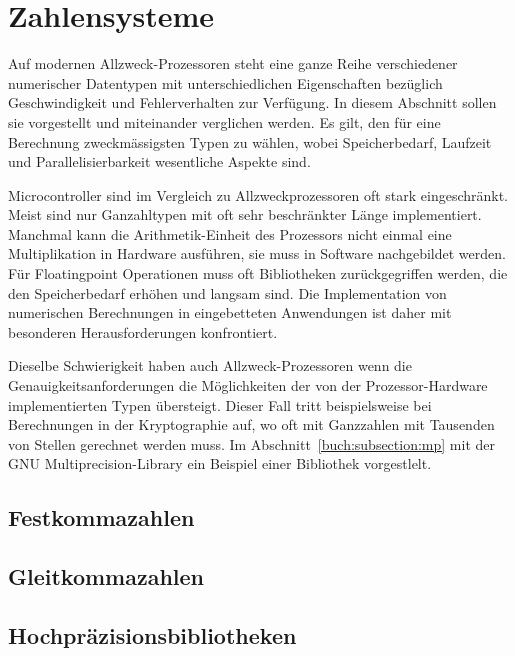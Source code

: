 %
%
%
\section{Zahlensysteme
\label{buch:section:zahlensysteme}}
Auf modernen Allzweck-Prozessoren steht eine ganze Reihe verschiedener
numerischer Datentypen mit unterschiedlichen Eigenschaften
bezüglich Geschwindigkeit und Fehlerverhalten zur Verfügung.
In diesem Abschnitt sollen sie vorgestellt und miteinander verglichen
werden.
Es gilt, den für eine Berechnung zweckmässigsten Typen zu wählen,
wobei Speicherbedarf, Laufzeit und Parallelisierbarkeit wesentliche
Aspekte sind.

Microcontroller sind im Vergleich zu Allzweckprozessoren oft stark
%
eingeschränkt.
Meist sind nur Ganzahltypen mit oft sehr beschränkter Länge implementiert.
Manchmal kann die Arithmetik-Einheit des Prozessors nicht einmal eine
Multiplikation in Hardware ausführen, sie muss in Software nachgebildet
werden.
Für Floatingpoint Operationen muss oft Bibliotheken zurückgegriffen
werden, die den Speicherbedarf erhöhen und langsam sind.
Die Implementation von numerischen Berechnungen in eingebetteten Anwendungen
ist daher mit besonderen Herausforderungen konfrontiert.

Dieselbe Schwierigkeit haben auch Allzweck-Prozessoren wenn die
Genauigkeitsanforderungen die Möglichkeiten der von der Prozessor-Hardware
implementierten Typen übersteigt.
Dieser Fall tritt beispielsweise bei Berechnungen in der Kryptographie auf,
wo oft mit Ganzzahlen mit Tausenden von Stellen gerechnet werden muss.
Im Abschnitt~\ref{buch:subsection:mp} mit der GNU Multiprecision-Library
ein Beispiel einer Bibliothek vorgestlelt.


\subsection{Festkommazahlen
\label{buch:subsection:integers}}

\subsection{Gleitkommazahlen
\label{buch:subsection:floatinpoing}}

\subsection{Hochpräzisionsbibliotheken
\label{buch:subsection:mp}}
